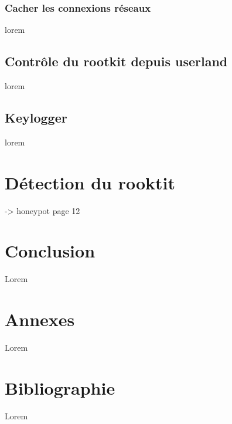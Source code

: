 \documentclass[11pt]{article}
\begin{document}
			
		\subsubsection{Cacher les connexions réseaux}
			lorem
			
	\subsection{Contrôle du rootkit depuis userland}
	\label{sec:crumb}
		lorem
	\subsection{Keylogger}
		lorem
		
\section{Détection du rooktit}
	
	-> honeypot page 12
	
			
\section{Conclusion}
	Lorem
\section{Annexes}
	Lorem
\section{Bibliographie}
	Lorem
\end{document}

